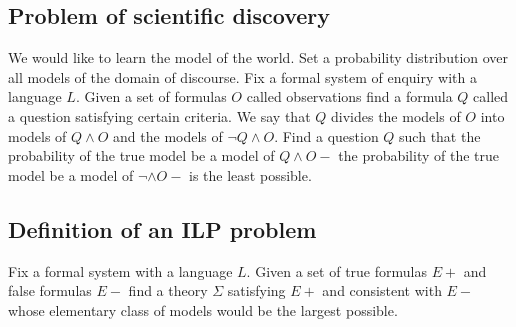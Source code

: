 \subsection{Problem of scientific discovery}
We would like to learn the model of the world. Set a probability distribution over all models of the domain of discourse. Fix a formal system of enquiry with a language $L$. Given a set of formulas $O$ called observations find a formula $Q$ called a question satisfying certain criteria.
We say that $Q$ divides the models of $O$ into models of $Q \wedge O$ and the models of $\neg Q \wedge O$. Find a question $Q$ such that the probability of the true model be a model of $Q \wedge O \minus$ the probability of the true model be a model of $\neg \wedge O \minus$ is the least possible.

\subsection{Definition of an ILP problem}
Fix a formal system with a language $L$. Given a set of true formulas $E+$ and false formulas $E-$ find a theory $\Sigma$ satisfying $E+$ and consistent with $E-$ whose elementary class of models would be the largest possible.